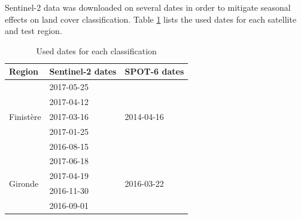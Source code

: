 \documentclass[10pt]{article}
\begin{document}
Sentinel-2 data was downloaded on several dates in order to mitigate seasonal effects on land cover classification. Table \ref{table:dates} lists the used dates for each satellite and test region.
\begin{table}[H]
\centering
\begin{tabular}{lll}\toprule
Region & Sentinel-2 dates & SPOT-6 dates \\\hline
\multirow{5}{*}{Finistère} & 2017-05-25 & \multirow{5}{*}{2014-04-16} \\
 & 2017-04-12 &  \\
 & 2017-03-16 &  \\
 & 2017-01-25 &  \\
 & 2016-08-15 &  \\\hline
\multirow{4}{*}{Gironde} & 2017-06-18 & \multirow{4}{*}{2016-03-22} \\
 & 2017-04-19 &  \\
 & 2016-11-30 &  \\
 & 2016-09-01 &  \\\bottomrule
\end{tabular}
\caption{Used dates for each classification}
\label{table:dates}
\end{table}
\end{document}
